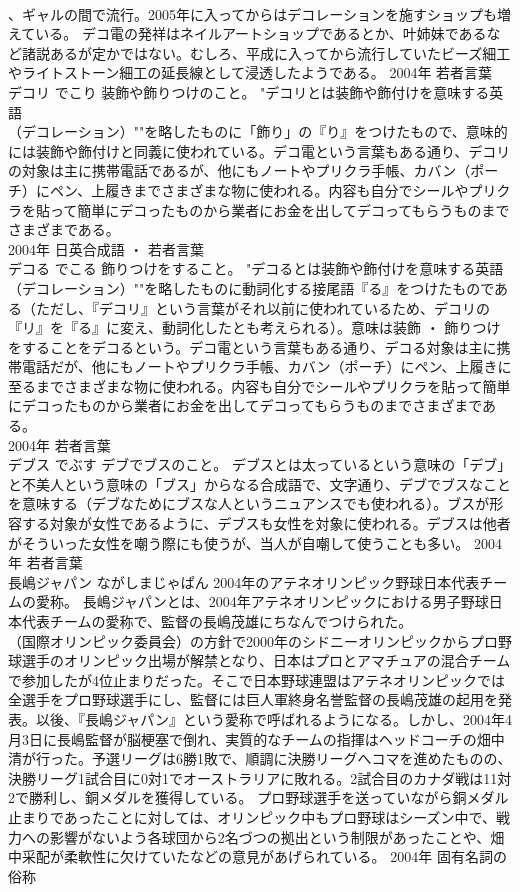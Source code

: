 \documentclass[8pt]{extreport}
\begin{document}
\begin{CJK}{UTF8}{min}
\\	、ギャルの間で流行。2005年に入ってからはデコレーションを施すショップも増えている。 デコ電の発祥はネイルアートショップであるとか、叶姉妹であるなど諸説あるが定かではない。むしろ、平成に入ってから流行していたビーズ細工やライトストーン細工の延長線として浸透したようである。	2004年	若者言葉	
\\	デコリ	でこり	装飾や飾りつけのこと。	"デコリとは装飾や飾付けを意味する英語
\\	（デコレーション）""を略したものに「飾り」の『り』をつけたもので、意味的には装飾や飾付けと同義に使われている。デコ電という言葉もある通り、デコリの対象は主に携帯電話であるが、他にもノートやプリクラ手帳、カバン（ポーチ）にペン、上履きまでさまざまな物に使われる。内容も自分でシールやプリクラを貼って簡単にデコったものから業者にお金を出してデコってもらうものまでさまざまである。
\\	2004年	日英合成語 ・ 若者言葉	
\\	デコる	でこる	飾りつけをすること。	"デコるとは装飾や飾付けを意味する英語
\\	（デコレーション）""を略したものに動詞化する接尾語『る』をつけたものである（ただし、『デコリ』という言葉がそれ以前に使われているため、デコリの『リ』を『る』に変え、動詞化したとも考えられる）。意味は装飾 ・ 飾りつけをすることをデコるという。デコ電という言葉もある通り、デコる対象は主に携帯電話だが、他にもノートやプリクラ手帳、カバン（ポーチ）にペン、上履きに至るまでさまざまな物に使われる。内容も自分でシールやプリクラを貼って簡単にデコったものから業者にお金を出してデコってもらうものまでさまざまである。
\\	2004年	若者言葉	
\\	デブス	でぶす	デブでブスのこと。	デブスとは太っているという意味の「デブ」と不美人という意味の「ブス」からなる合成語で、文字通り、デブでブスなことを意味する（デブなためにブスな人というニュアンスでも使われる）。ブスが形容する対象が女性であるように、デブスも女性を対象に使われる。デブスは他者がそういった女性を嘲う際にも使うが、当人が自嘲して使うことも多い。	2004年	若者言葉	
\\	長嶋ジャパン	ながしまじゃぱん	2004年のアテネオリンピック野球日本代表チームの愛称。	長嶋ジャパンとは、2004年アテネオリンピックにおける男子野球日本代表チームの愛称で、監督の長嶋茂雄にちなんでつけられた。 
\\	（国際オリンピック委員会）の方針で2000年のシドニーオリンピックからプロ野球選手のオリンピック出場が解禁となり、日本はプロとアマチュアの混合チームで参加したが4位止まりだった。そこで日本野球連盟はアテネオリンピックでは全選手をプロ野球選手にし、監督には巨人軍終身名誉監督の長嶋茂雄の起用を発表。以後、『長嶋ジャパン』という愛称で呼ばれるようになる。しかし、2004年4月3日に長嶋監督が脳梗塞で倒れ、実質的なチームの指揮はヘッドコーチの畑中清が行った。予選リーグは6勝1敗で、順調に決勝リーグへコマを進めたものの、決勝リーグ1試合目に0対1でオーストラリアに敗れる。2試合目のカナダ戦は11対2で勝利し、銅メダルを獲得している。 プロ野球選手を送っていながら銅メダル止まりであったことに対しては、オリンピック中もプロ野球はシーズン中で、戦力への影響がないよう各球団から2名づつの拠出という制限があったことや、畑中采配が柔軟性に欠けていたなどの意見があげられている。	2004年	固有名詞の俗称	

\end{CJK}
\end{document}
